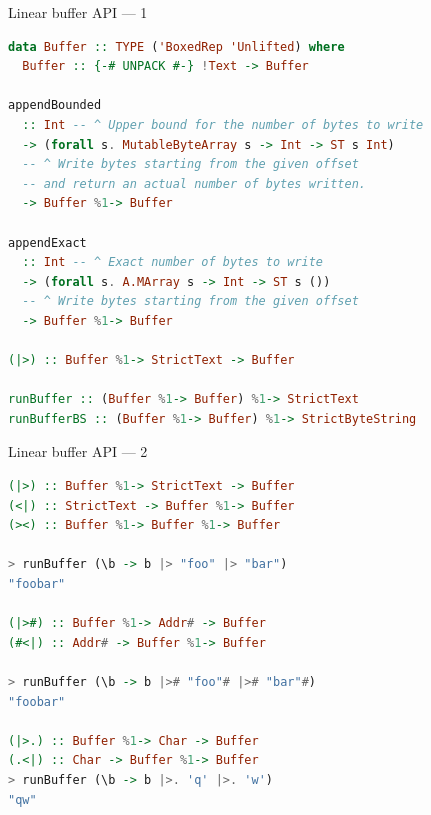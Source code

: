 \documentclass[handout]{beamer}
\begin{document}

\begin{frame}[fragile]{Linear buffer API --- 1}

\begin{lstlisting}[language=Haskell]
data Buffer :: TYPE ('BoxedRep 'Unlifted) where
  Buffer :: {-# UNPACK #-} !Text -> Buffer

appendBounded
  :: Int -- ^ Upper bound for the number of bytes to write
  -> (forall s. MutableByteArray s -> Int -> ST s Int)
  -- ^ Write bytes starting from the given offset
  -- and return an actual number of bytes written.
  -> Buffer %1-> Buffer

appendExact
  :: Int -- ^ Exact number of bytes to write
  -> (forall s. A.MArray s -> Int -> ST s ())
  -- ^ Write bytes starting from the given offset
  -> Buffer %1-> Buffer

(|>) :: Buffer %1-> StrictText -> Buffer

runBuffer :: (Buffer %1-> Buffer) %1-> StrictText
runBufferBS :: (Buffer %1-> Buffer) %1-> StrictByteString
\end{lstlisting}

\end{frame}

\begin{frame}[fragile]{Linear buffer API --- 2}

\begin{lstlisting}[language=Haskell]
(|>) :: Buffer %1-> StrictText -> Buffer
(<|) :: StrictText -> Buffer %1-> Buffer
(><) :: Buffer %1-> Buffer %1-> Buffer

> runBuffer (\b -> b |> "foo" |> "bar")
"foobar"

(|>#) :: Buffer %1-> Addr# -> Buffer
(#<|) :: Addr# -> Buffer %1-> Buffer

> runBuffer (\b -> b |># "foo"# |># "bar"#)
"foobar"

(|>.) :: Buffer %1-> Char -> Buffer
(.<|) :: Char -> Buffer %1-> Buffer
> runBuffer (\b -> b |>. 'q' |>. 'w')
"qw"
\end{lstlisting}

\end{frame}
\end{document}
